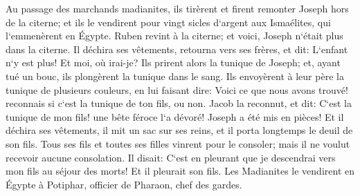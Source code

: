 \verse Au passage des marchands madianites, ils tirèrent et firent remonter Joseph hors de la citerne; et ils le vendirent pour vingt sicles d`argent aux Ismaélites, qui l`emmenèrent en Égypte. 
\verse Ruben revint à la citerne; et voici, Joseph n`était plus dans la citerne. Il déchira ses vêtements, 
\verse retourna vers ses frères, et dit: L`enfant n`y est plus! Et moi, où irai-je? 
\verse Ils prirent alors la tunique de Joseph; et, ayant tué un bouc, ils plongèrent la tunique dans le sang. 
\verse Ils envoyèrent à leur père la tunique de plusieurs couleurs, en lui faisant dire: Voici ce que nous avons trouvé! reconnais si c`est la tunique de ton fils, ou non. 
\verse Jacob la reconnut, et dit: C`est la tunique de mon fils! une bête féroce l`a dévoré! Joseph a été mis en pièces! 
\verse Et il déchira ses vêtements, il mit un sac sur ses reins, et il porta longtemps le deuil de son fils. 
\verse Tous ses fils et toutes ses filles vinrent pour le consoler; mais il ne voulut recevoir aucune consolation. Il disait: C`est en pleurant que je descendrai vers mon fils au séjour des morts! Et il pleurait son fils. 
\verse Les Madianites le vendirent en Égypte à Potiphar, officier de Pharaon, chef des gardes. 

